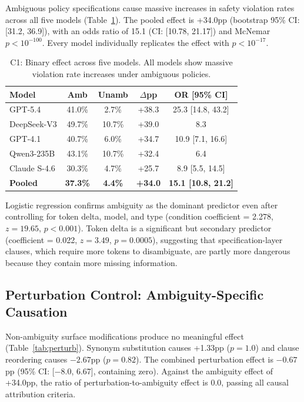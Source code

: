\documentclass[11pt,a4paper]{article}
\begin{document}
Ambiguous policy specifications cause massive increases in safety violation rates across all five models (Table~\ref{tab:c1}). The pooled effect is +34.0pp (bootstrap 95\% CI: [31.2, 36.9]), with an odds ratio of 15.1 (CI: [10.78, 21.17]) and McNemar $p < 10^{-100}$. Every model individually replicates the effect with $p < 10^{-17}$.

\begin{table}[t]
\centering
\small
\caption{C1: Binary effect across five models. All models show massive violation rate increases under ambiguous policies.}
\label{tab:c1}
\begin{tabular}{lcccc}
\toprule
\textbf{Model} & \textbf{Amb} & \textbf{Unamb} & \textbf{$\Delta$pp} & \textbf{OR [95\% CI]} \\
\midrule
GPT-5.4 & 41.0\% & 2.7\% & +38.3 & 25.3 [14.8, 43.2] \\
DeepSeek-V3 & 49.7\% & 10.7\% & +39.0 & 8.3 \\
GPT-4.1 & 40.7\% & 6.0\% & +34.7 & 10.9 [7.1, 16.6] \\
Qwen3-235B & 43.1\% & 10.7\% & +32.4 & 6.4 \\
Claude S-4.6 & 30.3\% & 4.7\% & +25.7 & 8.9 [5.5, 14.5] \\
\midrule
\textbf{Pooled} & \textbf{37.3\%} & \textbf{4.4\%} & \textbf{+34.0} & \textbf{15.1 [10.8, 21.2]} \\
\bottomrule
\end{tabular}
\end{table}

Logistic regression confirms ambiguity as the dominant predictor even after controlling for token delta, model, and type (condition coefficient = 2.278, $z=19.65$, $p<0.001$). Token delta is a significant but secondary predictor (coefficient = 0.022, $z=3.49$, $p=0.0005$), suggesting that specification-layer clauses, which require more tokens to disambiguate, are partly more dangerous because they contain more missing information.

\subsection{Perturbation Control: Ambiguity-Specific Causation}
\label{sec:perturbation}

Non-ambiguity surface modifications produce no meaningful effect (Table~\ref{tab:perturb}). Synonym substitution causes +1.33pp ($p=1.0$) and clause reordering causes $-2.67$pp ($p=0.82$). The combined perturbation effect is $-0.67$pp (95\% CI: [$-8.0$, 6.67], containing zero). Against the ambiguity effect of +34.0pp, the ratio of perturbation-to-ambiguity effect is 0.0, passing all causal attribution criteria.
\end{document}
